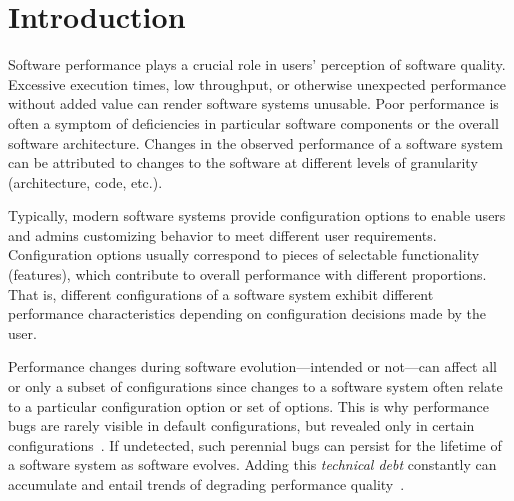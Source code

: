 \documentclass[sigconf]{acmart}
\begin{document}
	
	\maketitle
	
	
	\section{Introduction}
	Software performance plays a crucial role in users' perception of software quality.
	Excessive execution times, low throughput, or otherwise unexpected performance without added value can render software systems unusable.
	Poor performance is often a symptom of deficiencies in particular software components or the overall software architecture.
	Changes in the observed performance of a software system can be attributed to changes to the software at different levels of granularity (architecture, code, etc.).
	
	Typically, modern software systems provide configuration options to enable users and admins  customizing behavior to meet different user requirements.
	Configuration options usually correspond to pieces of selectable functionality (features), which contribute to overall performance with different proportions.
	That is, different configurations of a software system exhibit different performance characteristics depending on configuration decisions made by the user.
	
	Performance changes during software evolution---intended or not---can affect all or only a subset of configurations since changes to a software system often relate to a particular configuration option or set of options.
	This is why performance bugs are rarely visible in default configurations, but revealed only in certain configurations~\cite{hanEmpiricalStudyPerformance2016}.
	If undetected, such perennial bugs can persist for the lifetime of a software system as software evolves.
	Adding this \emph{technical debt} constantly can accumulate and entail trends of degrading performance quality~\cite{guoGeneticAlgorithmOptimized2011}.
	
\end{document}
